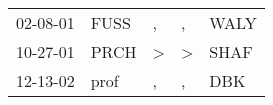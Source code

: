 \begin{supertabular}{lllll}
 02-08-01 &  FUSS &             , &             , &  WALY \\
 10-27-01 &  PRCH &  \textgreater &  \textgreater &  SHAF \\
 12-13-02 &  prof &             , &             , &   DBK \\
\end{supertabular}
